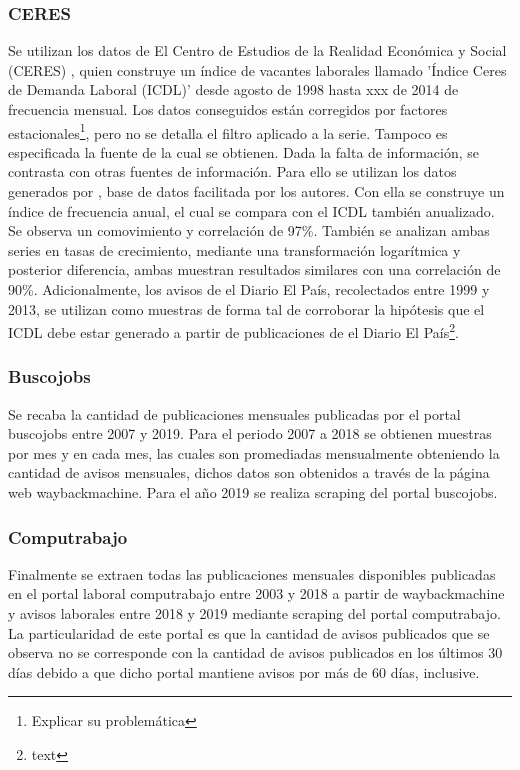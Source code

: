 \subsubsection*{CERES}
Se utilizan los datos de El Centro de Estudios de la Realidad Económica y Social (CERES) \cite{Ceres2012}, quien construye un índice de vacantes laborales llamado 'Índice Ceres de Demanda Laboral (ICDL)' desde agosto de 1998 hasta  xxx de 2014 de frecuencia mensual. Los datos conseguidos están corregidos por factores estacionales\footnote{Explicar su problemática}, pero no se detalla el filtro aplicado a la serie. Tampoco es especificada la fuente de la cual se obtienen.
Dada la falta de información, se contrasta con otras fuentes de información. Para ello se utilizan los datos generados por \cite{Alma2011}, base de datos facilitada por los autores. Con ella se construye un índice de frecuencia anual, el cual se compara con el ICDL también anualizado. Se observa un comovimiento y correlación de 97\%. También se analizan ambas series en tasas de crecimiento, mediante una transformación logarítmica y posterior diferencia, ambas muestran resultados similares con una correlación de 90\%.
Adicionalmente, los avisos de el Diario El País, recolectados entre 1999 y 2013, se utilizan como muestras de forma tal de corroborar la hipótesis que el ICDL debe estar generado a partir de publicaciones de el Diario El País\footnote{text}.

\subsubsection*{Buscojobs}
Se recaba la cantidad de publicaciones mensuales publicadas por el portal buscojobs entre 2007 y 2019. Para el periodo 2007 a 2018 se obtienen muestras por mes y en cada mes, las cuales son promediadas mensualmente obteniendo la cantidad de avisos mensuales, dichos datos son obtenidos a través de la página web waybackmachine. 
Para el año 2019 se realiza scraping del portal buscojobs.

\subsubsection*{Computrabajo}
Finalmente se extraen todas las publicaciones mensuales disponibles publicadas en el portal laboral computrabajo entre 2003 y 2018 a partir de waybackmachine y avisos laborales entre 2018 y 2019 mediante scraping del portal computrabajo. La particularidad de este portal es que la cantidad de avisos publicados que se observa no se corresponde con la cantidad de avisos publicados en los últimos 30 días debido a que dicho portal mantiene avisos por más de 60 días, inclusive. 

